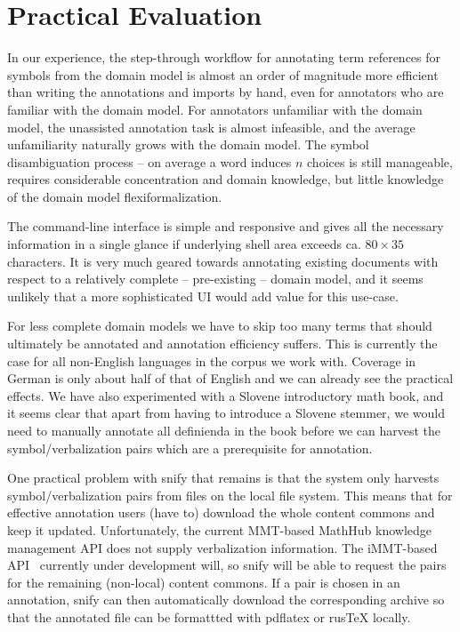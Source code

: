 \documentclass{llncs}
\newcommand\snify{\textsf{snify}\xspace}
\begin{document}
\section{Practical Evaluation}

In our experience, the step-through workflow for annotating term references for symbols
from the domain model is almost an order of magnitude more efficient than writing the
annotations and imports by hand, even for annotators who are familiar with the domain
model. For annotators unfamiliar with the domain model, the unassisted annotation task is
almost infeasible, and the average unfamiliarity naturally grows with the domain
model. The symbol disambiguation process -- on average a word induces $n$ choices is still manageable,
requires considerable concentration and domain knowledge, but little knowledge of the
domain model flexiformalization.

The command-line interface is simple and responsive and gives all the necessary
information in a single glance if underlying shell area exceeds ca. $80\times 35$
characters. It is very much geared towards annotating existing documents with respect to a
relatively complete -- pre-existing -- domain model, and it seems unlikely that a more
sophisticated UI would add value for this use-case.

For less complete domain models we have to skip too many terms that should ultimately be
annotated and annotation efficiency suffers. This is currently the case for all
non-English languages in the \sTeX corpus we work with. Coverage in German is only about
half of that of English and we can already see the practical effects. We have also
experimented with a Slovene introductory math book, and it seems clear that apart from
having to introduce a Slovene stemmer, we would need to manually annotate all
definienda in the book before we can harvest the symbol/verbalization pairs which are a
prerequisite for annotation.

One practical problem with \snify that remains is that the system only harvests
symbol/verbalization pairs from \sTeX files on the local file system. This means that for
effective annotation users (have to) download the whole content commons and keep it
updated. Unfortunately, the current MMT-based MathHub knowledge management
API does not supply verbalization information. The iMMT-based
API~\cite{iMMT:on} currently under development will, so \snify will be able to request the
pairs for the remaining (non-local) content commons. If a pair is chosen in an annotation,
\snify can then automatically download the corresponding archive so that the annotated
file can be formattted with pdflatex or rusTeX locally.
\end{document}
